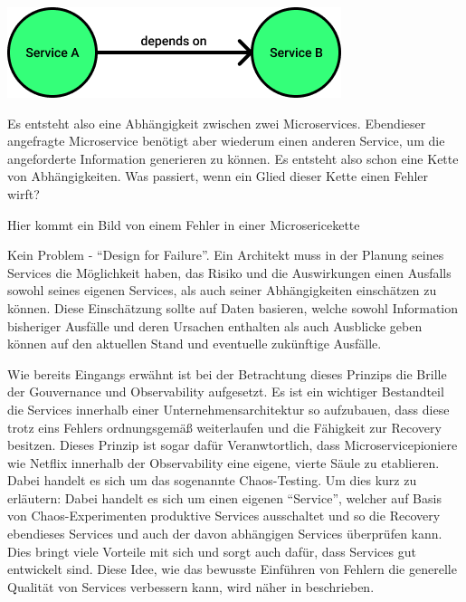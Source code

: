 \begin{center}
	\includegraphics[width=0.55\linewidth]{img/service_dependency.png}
\end{center}

Es entsteht also eine Abhängigkeit zwischen zwei Microservices. Ebendieser angefragte Microservice benötigt aber wiederum einen anderen Service, um die angeforderte Information generieren zu können. Es entsteht also schon eine Kette von Abhängigkeiten. Was passiert, wenn ein Glied dieser Kette einen Fehler wirft? 

\Large Hier kommt ein Bild von einem Fehler in einer Microsericekette

\normalsize

Kein Problem - \enquote{Design for Failure}. Ein Architekt muss in der Planung seines Services die Möglichkeit haben, das Risiko und die Auswirkungen einen Ausfalls sowohl seines eigenen Services, als auch seiner Abhängigkeiten einschätzen zu können. Diese Einschätzung sollte auf Daten basieren, welche sowohl Information bisheriger Ausfälle und deren Ursachen enthalten als auch Ausblicke geben können auf den aktuellen Stand und eventuelle zukünftige Ausfälle.

Wie bereits Eingangs erwähnt ist bei der Betrachtung dieses Prinzips die Brille der Gouvernance und Observability aufgesetzt. Es ist ein wichtiger Bestandteil die Services innerhalb einer Unternehmensarchitektur so aufzubauen, dass diese trotz eins Fehlers ordnungsgemäß weiterlaufen und die Fähigkeit zur Recovery besitzen. Dieses Prinzip ist sogar dafür Veranwtortlich, dass Microservicepioniere wie Netflix innerhalb der Observability eine eigene, vierte Säule zu etablieren. Dabei handelt es sich um das sogenannte Chaos-Testing. Um dies kurz zu erläutern: Dabei handelt es sich um einen eigenen \enquote{Service}, welcher auf Basis von Chaos-Experimenten produktive Services ausschaltet und so die Recovery ebendieses Services und auch der davon abhängigen Services überprüfen kann. Dies bringt viele Vorteile mit sich und sorgt auch dafür, dass Services gut entwickelt sind. Diese Idee, wie das bewusste Einführen von Fehlern die generelle Qualität von Services verbessern kann, wird näher in \autocite{AntifragileOrganization} beschrieben.

